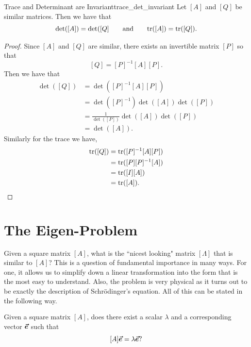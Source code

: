         \begin{prop}{Trace and Determinant are Invariant}{trace_det_invariant}
            Let $[A]$ and $[Q]$ be similar matrices.  Then we have that
            \[
            \det([A])=\det([Q] \qquad \textrm{and} \qquad \mathrm{tr}([A])=\mathrm{tr}([Q]).
            \]
            \tcblower
            \begin{proof}
            Since $[A]$ and $[Q]$ are similar, there exists an invertible matrix $[P]$ so that
            \[
            [Q]=[P]^{-1}[A][P].
            \]
            Then we have that
            \begin{align*}
                \det([Q])&= \det([P]^{-1}[A][P])\\
                &= \det([P]^{-1})\det([A])\det([P])\\
                &=\frac{1}{\det([P])} \det([A])\det([P])\\
                &=\det([A]).
            \end{align*}
            Similarly for the trace we have,
            \begin{align*}
                \mathrm{tr}([Q])&= \mathrm{tr}([P]^{-1}[A][P])\\
                &= \mathrm{tr}([P][P]^{-1}[A])\\
                &= \mathrm{tr}([I][A])\\
                &=\mathrm{tr}([A]).
                \end{align*}
            \end{proof}
        \end{prop}
        
   \section{The Eigen-Problem}
        Given a square matrix $[A]$, what is the ``nicest looking" matrix $[\Lambda]$ that is similar to $[A]$? This is a question of fundamental importance in many ways.  For one, it allows us to simplify down a linear transformation into the form that is the most easy to understand.  Also, the problem is very physical as it turns out to be exactly the description of Schr\"odinger's equation. All of this can be stated in the following way.
        
        \begin{question}
        Given a square matrix $[A]$, does there exist a scalar $\lambda$ and a corresponding vector $\boldsymbol{\vec{e}}$ such that
        \[
        [A]\boldsymbol{\vec{e}}=\lambda \boldsymbol{\vec{e}}?
        \]
        \end{question}
        

